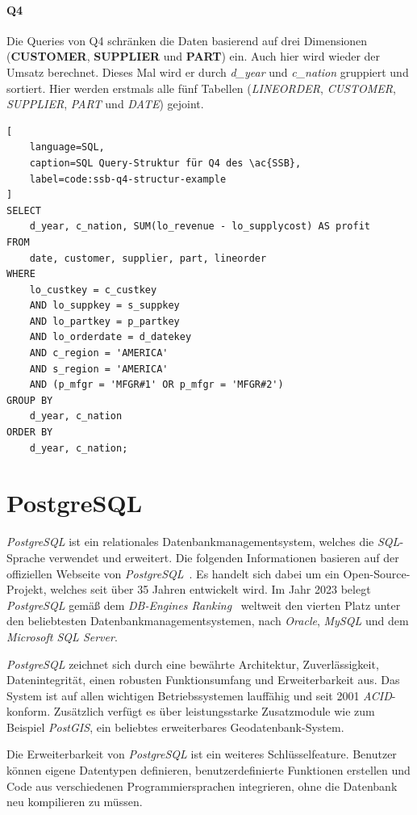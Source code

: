 \paragraph{Q4}
Die Queries von Q4 schränken die Daten basierend auf drei Dimensionen (\textbf{CUSTOMER}, \textbf{SUPPLIER} und \textbf{PART}) ein.
Auch hier wird wieder der Umsatz berechnet.
Dieses Mal wird er durch \emph{d\_year} und \emph{c\_nation} gruppiert und sortiert.
Hier werden erstmals alle fünf Tabellen (\emph{LINEORDER}, \emph{CUSTOMER}, \emph{SUPPLIER}, \emph{PART} und \emph{DATE}) gejoint.
\begin{lstlisting}[
    language=SQL,
    caption=SQL Query-Struktur für Q4 des \ac{SSB},
    label=code:ssb-q4-structur-example
]
SELECT 
    d_year, c_nation, SUM(lo_revenue - lo_supplycost) AS profit
FROM 
    date, customer, supplier, part, lineorder
WHERE 
    lo_custkey = c_custkey
    AND lo_suppkey = s_suppkey
    AND lo_partkey = p_partkey
    AND lo_orderdate = d_datekey
    AND c_region = 'AMERICA'
    AND s_region = 'AMERICA'
    AND (p_mfgr = 'MFGR#1' OR p_mfgr = 'MFGR#2')
GROUP BY 
    d_year, c_nation
ORDER BY 
    d_year, c_nation;

\end{lstlisting}

\section{PostgreSQL}
\emph{PostgreSQL} ist ein relationales Datenbankmanagementsystem, welches die \emph{SQL}-Sprache verwendet und erweitert. Die folgenden Informationen basieren auf der offiziellen Webseite von \emph{PostgreSQL}~\cite{the_postgresql_global_development_group_postgresql_nodate}. Es handelt sich dabei um ein Open-Source-Projekt, welches seit über 35 Jahren entwickelt wird. Im Jahr 2023 belegt \emph{PostgreSQL} gemäß dem \emph{DB-Engines Ranking}~\cite{db-engines_most_2023} weltweit den vierten Platz unter den beliebtesten Datenbankmanagementsystemen, nach \emph{Oracle}, \emph{MySQL} und dem \emph{Microsoft SQL Server}.

\emph{PostgreSQL} zeichnet sich durch eine bewährte Architektur, Zuverlässigkeit, Datenintegrität, einen robusten Funktionsumfang und Erweiterbarkeit aus. Das System ist auf allen wichtigen Betriebssystemen lauffähig und seit 2001 \emph{ACID}-konform.  Zusätzlich verfügt es über leistungsstarke Zusatzmodule wie zum Beispiel \emph{PostGIS}, ein beliebtes erweiterbares Geodatenbank-System.

Die Erweiterbarkeit von \emph{PostgreSQL} ist ein weiteres Schlüsselfeature. Benutzer können eigene Datentypen definieren, benutzerdefinierte Funktionen erstellen und Code aus verschiedenen Programmiersprachen integrieren, ohne die Datenbank neu kompilieren zu müssen.

